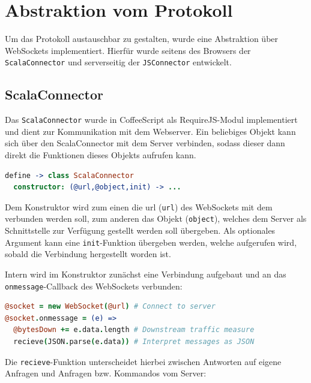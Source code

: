 \section{Abstraktion vom Protokoll}
\label{sec:jsc}

Um das Protokoll austauschbar zu gestalten, wurde eine Abstraktion über WebSockets implementiert.
Hierfür wurde seitens des Browsers der \texttt{ScalaConnector} und serverseitig der
\texttt{JSConnector} entwickelt.

\subsection{ScalaConnector}

Das \texttt{ScalaConnector} wurde in CoffeeScript als RequireJS-Modul implementiert und dient zur
Kommunikation mit dem Webserver. Ein beliebiges Objekt kann sich über den ScalaConnector mit dem
Server verbinden, sodass dieser dann direkt die Funktionen dieses Objekts aufrufen kann.

\begin{lstlisting}[language=coffee]
define -> class ScalaConnector
  constructor: (@url,@object,init) -> ...
\end{lstlisting}

Dem Konstruktor wird zum einen die url (\texttt{url}) des WebSockets mit dem verbunden werden soll,
zum anderen das Objekt (\texttt{object}), welches dem Server als Schnittstelle zur Verfügung
gestellt werden soll übergeben. Als optionales Argument kann eine \texttt{init}-Funktion übergeben
werden, welche aufgerufen wird, sobald die Verbindung hergestellt worden ist.

Intern wird im Konstruktor zunächst eine Verbindung aufgebaut und an das
\texttt{onmessage}-Callback des WebSockets verbunden:

\begin{lstlisting}[language=coffee]
@socket = new WebSocket(@url) # Connect to server
@socket.onmessage = (e) =>    
  @bytesDown += e.data.length # Downstream traffic measure
  recieve(JSON.parse(e.data)) # Interpret messages as JSON
\end{lstlisting}

Die \texttt{recieve}-Funktion unterscheidet hierbei zwischen Antworten auf eigene Anfragen und
Anfragen bzw. Kommandos vom Server:

